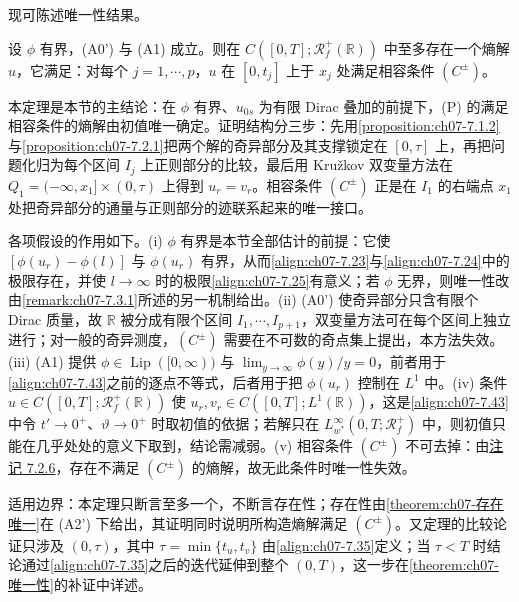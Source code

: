 \documentclass[../../main.tex]{subfiles}%
\begin{document}
现可陈述唯一性结果。

\begin{theorem}\label{theorem:ch07-唯一性}
设 $\phi$ 有界，(A0') 与 (A1) 成立。则在 $C([0,T];\mathscr{R}_f^+(\mathbb{R}))$ 中至多存在一个熵解 $u$，它满足：对每个 $j=1,\cdots,p$，$u$ 在 $[0,t_j]$ 上于 $x_j$ 处满足相容条件 $(C^\pm)$。
\end{theorem}

\begin{remark}\label{remark:ch07-唯一性动机}
本定理是本节的主结论：在 $\phi$ 有界、$u_{0s}$ 为有限 Dirac 叠加的前提下，(P) 的满足相容条件的熵解由初值唯一确定。证明结构分三步：先用\cref{proposition:ch07-7.1.2}与\cref{proposition:ch07-7.2.1}把两个解的奇异部分及其支撑锁定在 $[0,\tau]$ 上，再把问题化归为每个区间 $I_j$ 上正则部分的比较，最后用 Kružkov 双变量方法在 $Q_1=(-\infty,x_1]\times(0,\tau)$ 上得到 $u_r=v_r$。相容条件 $(C^\pm)$ 正是在 $I_1$ 的右端点 $x_1$ 处把奇异部分的通量与正则部分的迹联系起来的唯一接口。

各项假设的作用如下。(i) $\phi$ 有界是本节全部估计的前提：它使 $[\phi(u_r)-\phi(l)]$ 与 $\phi(u_r)$ 有界，从而\eqref{align:ch07-7.23}与\eqref{align:ch07-7.24}中的极限存在，并使 $l\to\infty$ 时的极限\eqref{align:ch07-7.25}有意义；若 $\phi$ 无界，则唯一性改由\hyperref[remark:ch07-7.3.1]{\cref{remark:ch07-7.3.1}}所述的另一机制给出。(ii) (A0') 使奇异部分只含有限个 Dirac 质量，故 $\mathbb{R}$ 被分成有限个区间 $I_1,\cdots,I_{p+1}$，双变量方法可在每个区间上独立进行；对一般的奇异测度，$(C^\pm)$ 需要在不可数的奇点集上提出，本方法失效。(iii) (A1) 提供 $\phi\in\operatorname{Lip}([0,\infty))$ 与 $\lim_{y\to\infty}\phi(y)/y=0$，前者用于\eqref{align:ch07-7.43}之前的逐点不等式，后者用于把 $\phi(u_r)$ 控制在 $L^1$ 中。(iv) 条件 $u\in C([0,T];\mathscr{R}_f^+(\mathbb{R}))$ 使 $u_r,v_r\in C([0,T];L^1(\mathbb{R}))$，这是\eqref{align:ch07-7.43}中令 $t'\to0^+$、$\vartheta\to0^+$ 时取初值的依据；若解只在 $L^\infty_{w^*}(0,T;\mathscr{R}_f^+)$ 中，则初值只能在几乎处处的意义下取到，结论需减弱。(v) 相容条件 $(C^\pm)$ 不可去掉：由\hyperref[remark:ch07-7.2.6]{注记 7.2.6}，存在不满足 $(C^\pm)$ 的熵解，故无此条件时唯一性失效。

适用边界：本定理只断言至多一个，不断言存在性；存在性由\cref{theorem:ch07-存在唯一}在 (A2') 下给出，其证明同时说明所构造熵解满足 $(C^\pm)$。又定理的比较论证只涉及 $(0,\tau)$，其中 $\tau=\min\{t_u,t_v\}$ 由\eqref{align:ch07-7.35}定义；当 $\tau<T$ 时结论通过\eqref{align:ch07-7.35}之后的迭代延伸到整个 $(0,T)$，这一步在\cref{theorem:ch07-唯一性}的补证中详述。
\end{remark}
\end{document}
